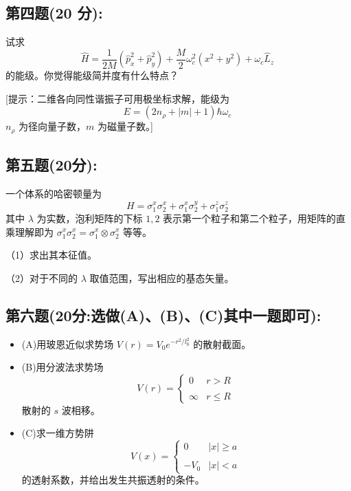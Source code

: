 \subsection{第四题(20 分):}
试求
\[\hat{H} = \frac{1}{2M} \left( \hat{p}_x^2 + \hat{p}_y^2 \right) + \frac{M}{2} \omega_c^2 \left( x^2 + y^2 \right) + \omega_c \hat{L}_z~\]
的能级。你觉得能级简并度有什么特点？

[提示：二维各向同性谐振子可用极坐标求解，能级为 
\[E = \left( 2n_\rho + |m| + 1 \right) \hbar \omega_c~\]
 $n_\rho$ 为径向量子数，$m$ 为磁量子数。]
\subsection{第五题(20分):}
一个体系的哈密顿量为 
\[H = \sigma_1^x \sigma_2^x + \sigma_1^x \sigma_2^y + \sigma_1^z \sigma_2^z ~\]
其中 $\lambda$ 为实数，泡利矩阵的下标 $1, 2$ 表示第一个粒子和第二个粒子，用矩阵的直乘理解即为 $\sigma_1^x \sigma_2^x = \sigma_1^x \otimes \sigma_2^x$ 等等。

（1）求出其本征值。

（2）对于不同的 $\lambda$ 取值范围，写出相应的基态矢量。
\subsection{第六题(20分:选做(A)、(B)、(C)其中一题即可):}
\begin{itemize}
    \item (A)用玻恩近似求势场 $V(r) = V_0 e^{-r^2 / l_0^2}$ 的散射截面。
    \item (B)用分波法求势场 
    \[    V(r) = \begin{cases}        0 & r > R \\\\        \infty & r \leq R    \end{cases} ~\]
    散射的 $s$ 波相移。
    \item (C)求一维方势阱 
    \[    V(x) = \begin{cases}        0 & |x| \geq a \\\\        -V_0 & |x| < a    \end{cases} ~\]
    的透射系数，并给出发生共振透射的条件。
\end{itemize}